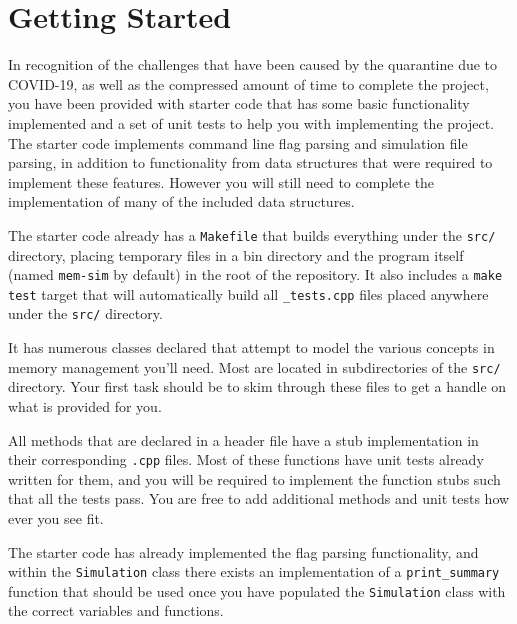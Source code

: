 \documentclass[10pt]{article}
\begin{document}

\section{Getting Started}

In recognition of the challenges that have been caused by the quarantine due to COVID-19, as well as the compressed amount of time to complete the project, you have been provided with starter code that has some basic functionality implemented and a set of unit tests to help you with implementing the project. The starter code implements command line flag parsing and simulation file parsing, in addition to functionality from data structures that were required to implement these features. However you will still need to complete the implementation of many of the included data structures.

The starter code already has a \texttt{Makefile} that builds everything under the \texttt{src/} directory, placing temporary files in a bin directory and the program itself (named \texttt{mem-sim} by default) in the root of the repository.
It also includes a \texttt{make test} target that will automatically build all \texttt{\_tests.cpp} files placed anywhere under the \texttt{src/} directory.

It has numerous classes declared that attempt to model the various concepts in memory management you’ll
need. Most are located in subdirectories of the \texttt{src/} directory. Your first task should be to skim through these files to get a handle on what is provided for you.


All methods that are declared in a header file have a stub implementation in their corresponding \texttt{.cpp} files.
Most of these functions have unit tests already written for them, and you will be required to implement the
function stubs such that all the tests pass. You are free to add additional methods and unit tests how ever
you see fit.

The starter code has already implemented the flag parsing functionality, and within the \texttt{Simulation} class there exists an implementation of a \texttt{print\_summary} function that should be used once you have populated the \texttt{Simulation} class with the correct variables and functions.
\end{document}
